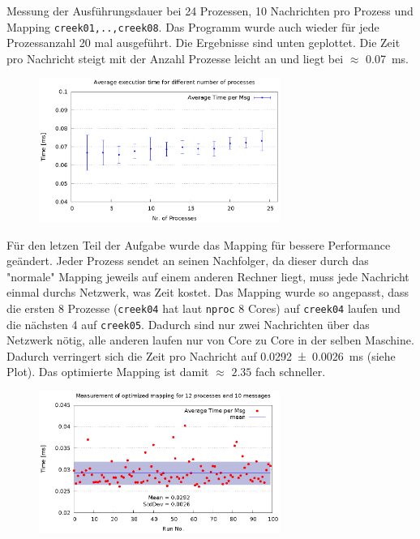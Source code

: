 \documentclass[a4paper,11pt]{scrartcl}
\begin{document}
Messung der Ausführungsdauer bei 24 Prozessen, 10 Nachrichten pro Prozess und Mapping \verb+creek01,..,creek08+. Das Programm wurde auch wieder für jede Prozessanzahl 20 mal ausgeführt. Die Ergebnisse sind unten geplottet. Die Zeit pro Nachricht steigt mit der Anzahl Prozesse leicht an und liegt bei $\approx$ \SI{0.07}{\milli\second}.\\


\begin{figure}[h!]
    \centering
    \includegraphics[width=0.7\textwidth,keepaspectratio]{2_1/data/time.eps}
\end{figure}


Für den letzen Teil der Aufgabe wurde das Mapping für bessere Performance geändert. Jeder Prozess sendet an seinen Nachfolger, da dieser durch das "normale" Mapping jeweils auf einem anderen Rechner liegt, muss jede Nachricht einmal durchs Netzwerk, was Zeit kostet. 
Das Mapping wurde so angepasst, dass die ersten 8 Prozesse (\verb+creek04+ hat laut \verb+nproc+ 8 Cores) auf \verb+creek04+ laufen und die nächsten 4 auf \verb+creek05+. Dadurch sind nur zwei Nachrichten über das Netzwerk nötig, alle anderen laufen nur von Core zu Core in der selben Maschine. \\

Dadurch verringert sich die Zeit pro Nachricht auf \SI[multi-part-units=single]{0.0292(26)}{\milli\second} (siehe Plot). Das optimierte Mapping ist damit $\approx$ $2.35$ fach schneller.

\begin{figure}[h!]
    \centering
    \includegraphics[width=0.7\textwidth,keepaspectratio]{2_1/data/opt.eps}
\end{figure}
\end{document}

